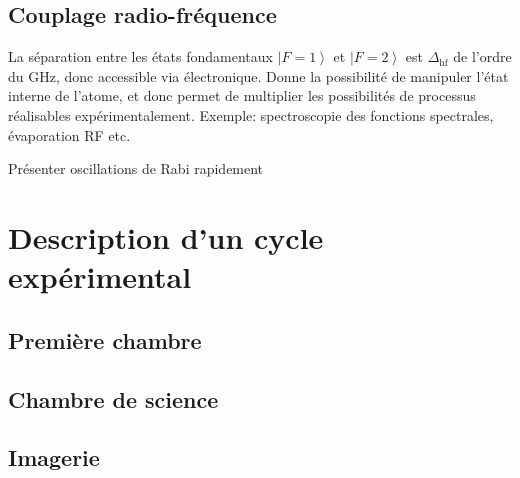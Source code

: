 \subsection{Couplage radio-fréquence} 
La séparation entre les états fondamentaux $\left| F=1 \right\rangle$ et $\left| F=2 \right\rangle$ est $\Delta_{\mathrm{hf}}$ de l'ordre du GHz, donc accessible via électronique. Donne la possibilité de manipuler l'état interne de l'atome, et donc permet de multiplier les possibilités de processus réalisables expérimentalement. Exemple: spectroscopie des fonctions spectrales, évaporation RF etc.

Présenter oscillations de Rabi rapidement

\section{Description d'un cycle expérimental}
\subsection{Première chambre}
\subsection{Chambre de science}
\subsection{Imagerie}

